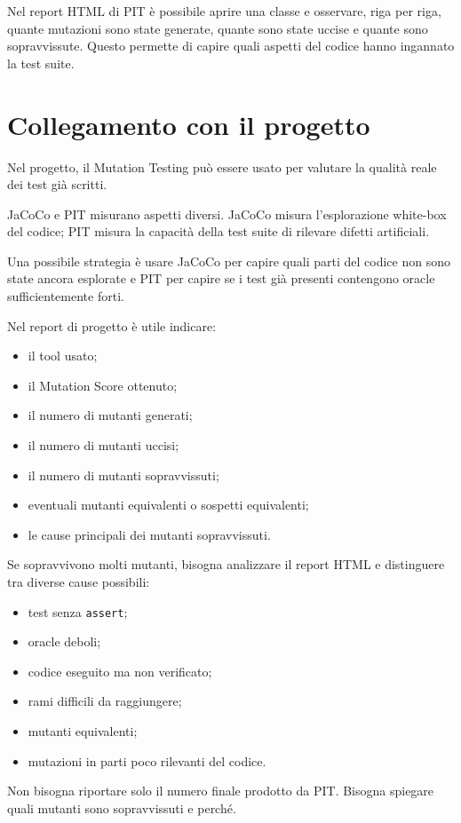 \begin{notaprof}
Nel report HTML di PIT è possibile aprire una classe e osservare, riga per riga, quante mutazioni sono state generate, quante sono state uccise e quante sono sopravvissute. Questo permette di capire quali aspetti del codice hanno ingannato la test suite.
\end{notaprof}

\section{Collegamento con il progetto}

Nel progetto, il Mutation Testing può essere usato per valutare la qualità reale dei test già scritti.

\begin{notaesame}
JaCoCo e PIT misurano aspetti diversi. JaCoCo misura l'esplorazione white-box del codice; PIT misura la capacità della test suite di rilevare difetti artificiali.
\end{notaesame}

Una possibile strategia è usare JaCoCo per capire quali parti del codice non sono state ancora esplorate e PIT per capire se i test già presenti contengono oracle sufficientemente forti.

Nel report di progetto è utile indicare:

\begin{itemize}
    \item il tool usato;
    \item il Mutation Score ottenuto;
    \item il numero di mutanti generati;
    \item il numero di mutanti uccisi;
    \item il numero di mutanti sopravvissuti;
    \item eventuali mutanti equivalenti o sospetti equivalenti;
    \item le cause principali dei mutanti sopravvissuti.
\end{itemize}

Se sopravvivono molti mutanti, bisogna analizzare il report HTML e distinguere tra diverse cause possibili:

\begin{itemize}
    \item test senza \texttt{assert};
    \item oracle deboli;
    \item codice eseguito ma non verificato;
    \item rami difficili da raggiungere;
    \item mutanti equivalenti;
    \item mutazioni in parti poco rilevanti del codice.
\end{itemize}

\begin{notaesame}
Non bisogna riportare solo il numero finale prodotto da PIT. Bisogna spiegare quali mutanti sono sopravvissuti e perché.
\end{notaesame}
